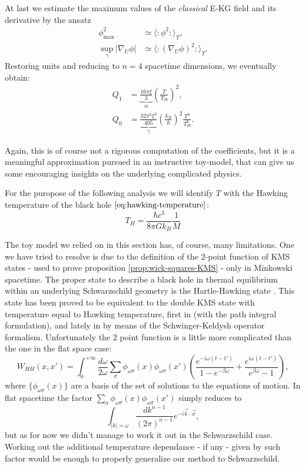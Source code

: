 At last we estimate the maximum values of the \emph{classical} E-KG field and its derivative by the ansatz 
\begin{align*}
	\phi_{\max}^2 &\simeq \langle \colon \phi^2 \colon\rangle_T,\\
	\sup_{\gamma}\vert \nabla_U\phi\vert &\simeq \langle \colon (\nabla_U\phi)^2 \colon\rangle_T.
\end{align*}
Restoring units and reducing to \(n = 4\) spacetime dimensions, we eventually obtain:
\begin{align}
	\label{eq:KMS_Q_1}
    Q_1 &= \underbrace{\frac{16\pi\xi}{3}}_{\alpha} \left(\frac{T}{T_{Pl}}\right)^2,\\
    Q_0 &= \underbrace{\frac{32\pi^6\xi^3}{405}}_{\gamma}\left(\frac{k_B}{\hbar}\right)^2 \frac{T^8}{T_{Pl}^6}.
\end{align}

Again, this is of course not a rigorous computation of the coefficients, but it is a meaningful approximation pursued in an instructive toy-model, that can give us some encouraging insights on the underlying complicated physics.

For the puropose of the following analysis we will identify \(T\) with the Hawking temperature of the black hole \(\eqref{eq:hawking-temperature}\):
\[
T_H = \frac{\hbar c^3}{8\pi Gk_B}\frac{1}{M}    
\]
    
\begin{remark}
	The toy model we relied on in this section has, of course, many limitations. One we have tried to resolve is due to the definition of the \(2\)-point function of KMS states - used to prove proposition \ref{prop:wick-squares-KMS} - only in Minkowski spacetime. The proper state to describe a black hole in thermal equilibrium within an underlying Schwarzschild geometry is the Hartle-Hawking state \cite[]{hartle1993path}. This state has been proved to be equivalent to the double KMS state with temperature equal to Hawking temperature, first in \cite[]{jacobson1994note, sanders2015construction} (with the path integral formulation), and lately in \cite[]{higuchi2022hartle} by means of the Schwinger-Keldysh operator formalism. Unfortunately the \(2\) point function is a little more complicated than the one in the flat space case:
	\[
	W_{HH}(x, x') = \int_{0}^{+\infty} \frac{d\omega}{2\omega} \sum_{\sigma}\phi_{\omega\sigma}(x)\phi_{\omega\sigma}(x')\left(\frac{e^{-i\omega(t - t')}}{1 - e^{-\beta \omega}} + \frac{e^{i\omega(t - t')}}{e^{\beta \omega} - 1}\right),
	\]
	where \(\{\phi_{\omega\sigma}(x)\}\) are a basis of the set of solutions to the equations of motion. In flat spacetime the factor \(\sum_{\sigma}\phi_{\omega\sigma}(x)\phi_{\omega\sigma}(x')\) simply reduces to 
	\[
		\int_{\vert k \vert = \omega}	\frac{dk^{n - 1}}{(2\pi)^{n - 1}} e^{-i\vec{k}\cdot \vec{x}},
	\]
	but as for now we didn't manage to work it out in the Schwarzschild case. Working out the additional temperature dependance - if any - given by such factor would be enough to properly generalize our method to Schwarzschild.
\end{remark}

